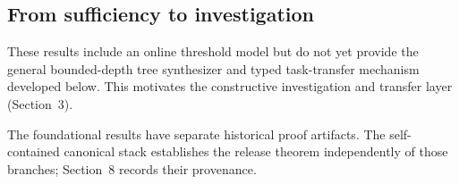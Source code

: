 \subsection{From sufficiency to investigation}
These results include an online threshold model but do not yet provide the general bounded-depth tree synthesizer and typed task-transfer mechanism developed below. This motivates the constructive investigation and transfer layer (Section~3).

The foundational results have separate historical proof artifacts. The self-contained canonical stack establishes the release theorem independently of those branches; Section~8 records their provenance.
